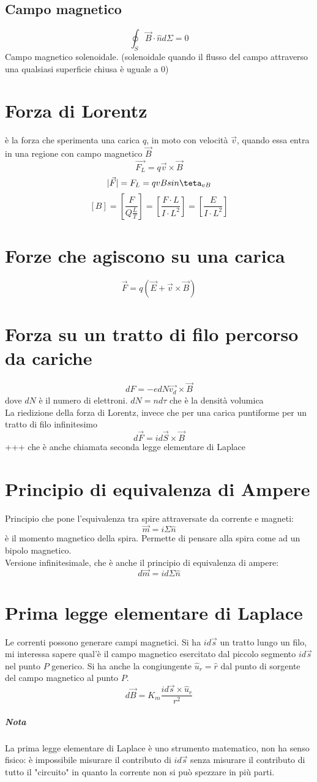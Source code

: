\documentclass[a4paper]{report}
\begin{document}
  \subsection{Campo magnetico}
  \[ \oint_S \vec{B}\cdot \hat{n} d\Sigma = 0 \]
  Campo magnetico solenoidale. (solenoidale quando il flusso del campo attraverso una qualsiasi superficie chiusa è uguale a 0)

  \section{Forza di Lorentz}
  è la forza che sperimenta una carica $q$, in moto con velocità $\vec{v}$, quando essa entra in una regione con campo magnetico $\vec{B}$
  \[ \vec{F_L} = q\vec{v} \times \vec{B} \]
  \[ |\vec{F}| = F_L = qvB sin\teta_{vB} \]
  \[ [B] = [\frac{F}{Q\frac{L}{T}}] = [\frac{F\cdot L}{I\cdot L^2}] = [\frac{E}{I\cdot L^2}] \]

  \section{Forze che agiscono su una carica}
  \[ \vec{F} = q(\vec{E} + \vec{v} \times \vec{B}) \]

  \section{Forza su un tratto di filo percorso da cariche}
  \[ dF = -e dN \vec{v_d} \times \vec{B}\]
  dove $dN$ è il numero di elettroni. $dN = nd\tau$ che è la densità volumica\\
  La riedizione della forza di Lorentz, invece che per una carica puntiforme per un tratto di filo infinitesimo
  \[ d\vec{F} = i d\vec{S} \times \vec{B} \]+++
  che è anche chiamata seconda legge elementare di Laplace

  \section{Principio di equivalenza di Ampere}
  Principio che pone l'equivalenza tra spire attraversate da corrente e magneti:
  \[ \vec{m} = i \Sigma \hat{n} \]
  è il momento magnetico della spira. Permette di pensare alla spira come ad un bipolo magnetico.\\
  Versione infinitesimale, che è anche il principio di equivalenza di ampere:
  \[ d\vec{m} = id\Sigma \hat{n} \]

  \section{Prima legge elementare di Laplace}
  Le correnti possono generare campi magnetici.
  Si ha $id\vec{s}$ un tratto lungo un filo, mi interessa sapere qual'è il campo magnetico esercitato dal piccolo segmento $id\vec{s}$ nel punto $P$ generico. Si ha anche la congiungente $\hat{u}_r=\hat{r}$ dal punto di sorgente del campo magnetico al punto $P$.
  \[ d\vec{B} = K_m \frac{id\vec{s} \times \hat{u}_r}{r^2} \]
  \subparagraph{Nota}
  La prima legge elementare di Laplace è uno strumento matematico, non ha senso fisico: è impossibile misurare il contributo di $id\vec{s}$ senza misurare il contributo di tutto il "circuito" in quanto la corrente non si può spezzare in più parti.
\end{document}
